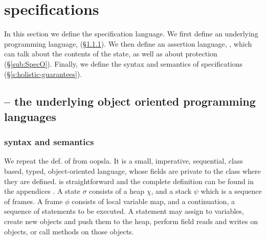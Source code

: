 \section{\SpecLang specifications}
\label{s:semantics}

 
In this section we define {the}  \SpecLang specification language.  
We first define an underlying programming language, \LangOO (\S \ref{sub:Loo}).
We then define an assertion language, \AssertLang, which can talk about the
contents of the state, as well as about protection (\S \ref{sub:SpecO}).  Finally, we define the syntax and
semantics of  \SpecLang
specifications (\S \ref{s:holistic-guarantees}).


\subsection{\LangOO -- the underlying object oriented programming languages}

\subsubsection{\LangOO syntax and semantics}
\label{sub:Loo} 
We repeat the def. of  \LangOO from oopsla. It is a {small}, imperative, sequential, 
class based, typed, object-oriented language, whose
fields are private to the class where they are defined. 
\LangOO is straightforward
{and the complete definition can be found in the appendices %
\cite{necessityFull}.}
 A \LangOO state $\sigma$ consists of a 
heap $\chi$, and a  {stack $\psi$ which is a sequence of frames}.
A frame $\phi$ consists of
local variable map, and a continuation, \ie a sequence of statements to be executed.
 A statement may assign to variables, create new objects and push them to the heap, 
perform field reads and writes on objects,  or
 call methods on those objects. 

